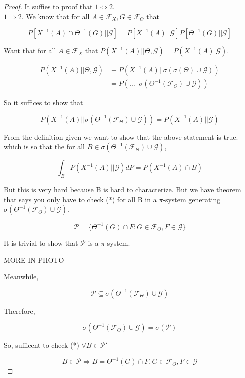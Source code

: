 \documentclass[11pt,fleqn]{book} %
\begin{document}
\begin{proof}
	It suffies to proof that $1 \Leftrightarrow 2$.\\

	$1 \Rightarrow 2$. We know that for all $A \in \mathcal{F}_X, G \in \mathcal{F}_\Theta$ that

			$$ P[X^{-1}(A) \cap \Theta^{-1}(G) || \mathcal{G}] =P[X^{-1}(A) || \mathcal{G}]P[\Theta^{-1}(G) || \mathcal{G}]$$

	Want that for all $A \in \mathcal{F}_X$ that $P(X^{-1}(A) || \Theta, \mathcal{G}) = P(X^{-1}(A)| \mathcal{G})$. 

	\begin{align*}
		P(X^{-1}(A) || \Theta, \mathcal{G}) &\equiv P\left(X^{-1}(A)|| \sigma(\sigma(\Theta) \cup \mathcal{G})\right) \\
			&= P(\dots || \sigma(\Theta^{-1}(\mathcal{F}_\Theta) \cup \mathcal{G}))
	\end{align*}

	So it suffices to show that 

			$$P(X^{-1}(A) || \sigma(\Theta^{-1}(\mathcal{F}_\Theta) \cup \mathcal{G})) = P(X^{-1}(A) || \mathcal{G})$$

	From the definition given we want to show that the above statement is true. which is so that the for all $B \in \sigma(\Theta^{-1}(\mathcal{F}_\Theta) \cup \mathcal{G} )$, 

			$$\int_B P(X^{-1}(A) || \mathcal{G}) dP = P(X^{-1} (A) \cap B) $$

	But this is very hard because B is hard to characterize. But we have theorem that says you only have to check (*) for all B in a $\pi$-system generating $\sigma(\Theta^{-1}(\mathcal{F}_\Theta)\cup \mathcal{G})$.

			$$\mathcal{P} = \{\Theta^{-1} (G) \cap F: G \in \mathcal{F}_\Theta, F \in \mathcal{G} \} $$

	It is trivial to show that $\mathcal{P}$ is a $\pi$-system. 

	MORE IN PHOTO

	Meanwhile, 

			$$\mathcal{P} \subseteq \sigma(\Theta^{-1} (\mathcal{F}_\Theta) \cup \mathcal{G}) $$

	Therefore, 

			$$\sigma(\Theta^{-1}(\mathcal{F}_\Theta)\cup \mathcal{G}) = \sigma(\mathcal{P}) $$

	So, sufficent to check (*) $\forall B \in \mathcal{P}'$

			$$B \in \mathcal{P} \Rightarrow B = \Theta^{-1}(G) \cap F, G \in \mathcal{F}_\Theta, F \in \mathcal{G} $$


\end{proof}
\end{document}
